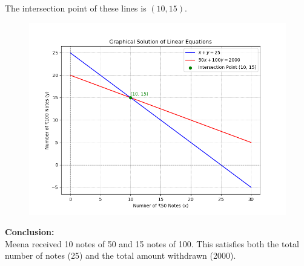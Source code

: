 \documentclass[journal]{IEEEtran}
\begin{document}
	The intersection point of these lines is \((10, 15)\).
	
	\begin{figure}[h]
		\centering
		\includegraphics[width=\textwidth]{figs/fig.png}
	\end{figure}
	
	\textbf{Conclusion:}\\
	Meena received 10 notes of 50 and 15 notes of 100. This satisfies both the total number of notes (25) and the total amount withdrawn (2000).
	
	
\end{document}
